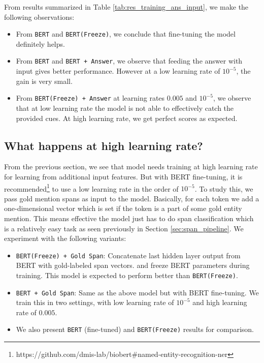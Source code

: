 From results summarized in Table \ref{tab:res_training_ans_input}, we make the following observations:
\begin{itemize}
    \item From \texttt{BERT} and \texttt{BERT(Freeze)}, we conclude that fine-tuning the model definitely helps.
    
    \item From \texttt{BERT} and \texttt{BERT + Answer}, we observe that feeding the answer with input gives better performance. However at a low learning rate of $10^{-5}$, the gain is very small.
    
    \item From \texttt{BERT(Freeze) + Answer} at learning rates $0.005$ and $10^{-5}$, we observe that at low learning rate the model is not able to effectively catch the provided cues. At high learning rate, we get perfect scores as expected.
\end{itemize}

\subsection{What happens at high learning rate?}
From the previous section, we see that model needs training at high learning rate for learning from additional input features. But with BERT fine-tuning, it is recommended\footnote{https://github.com/dmis-lab/biobert\#named-entity-recognition-ner} to use a low learning rate in the order of $10^{-5}$. To study this, we pass gold mention spans as input to the model. Basically, for each token we add a one-dimensional vector which is set if the token is a part of some gold entity mention. This means effective the model just has to do span classification which is a relatively easy task as seen previously in Section \ref{sec:span_pipeline}. We experiment with the following variants:

\begin{itemize}
    \item \texttt{BERT(Freeze) + Gold Span}: Concatenate last hidden layer output from BERT with gold-labeled span vectors. and freeze BERT parameters during training. This model is expected to perform better than \texttt{BERT(Freeze)}.
    
    \item \texttt{BERT + Gold Span}: Same as the above model but with BERT fine-tuning. We train this in two settings, with low learning rate of $10^{-5}$ and high learning rate of $0.005$.
    
    \item We also present \texttt{BERT} (fine-tuned) and \texttt{BERT(Freeze)} results for comparison.
\end{itemize}

